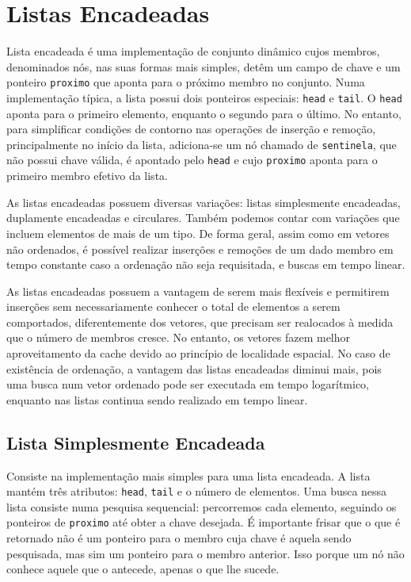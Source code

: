 \section{Listas Encadeadas}

Lista encadeada é uma implementação de conjunto dinâmico cujos membros, denominados
nós, nas suas formas mais simples, detêm um campo de chave e um ponteiro \texttt{proximo}
que aponta para o próximo membro no conjunto.
Numa implementação típica, a lista possui dois ponteiros especiais: \texttt{head} e
\texttt{tail}.
O \texttt{head} aponta para o primeiro elemento, enquanto o segundo para o último.
No entanto, para simplificar condições de contorno nas operações de inserção e remoção,
principalmente no início da lista, adiciona-se um nó chamado de \texttt{sentinela}, que
não possui chave válida, é apontado pelo \texttt{head} e cujo \texttt{proximo} aponta
para o primeiro membro efetivo da lista.

As listas encadeadas possuem diversas variações: listas simplesmente encadeadas,
duplamente encadeadas e circulares.
Também podemos contar com variações que incluem elementos de mais de um tipo.
De forma geral, assim como em vetores não ordenados, é possível realizar inserções e
remoções de um dado membro em tempo constante caso a ordenação não seja requisitada, e
buscas em tempo linear.

As listas encadeadas possuem a vantagem de serem mais flexíveis e permitirem inserções sem
necessariamente conhecer o total de elementos a serem comportados, diferentemente dos
vetores, que precisam ser realocados à medida que o número de membros cresce.
No entanto, os vetores fazem melhor aproveitamento da cache devido ao princípio de
localidade espacial.
No caso de existência de ordenação, a vantagem das listas encadeadas diminui mais,
pois uma busca num vetor ordenado pode ser executada em tempo logarítmico, enquanto
nas listas continua sendo realizado em tempo linear.

\subsection{Lista Simplesmente Encadeada}

Consiste na implementação mais simples para uma lista encadeada.
A lista mantém três atributos: \texttt{head}, \texttt{tail} e o número de elementos.
Uma busca nessa lista consiste numa pesquisa sequencial: percorremos cada elemento,
seguindo os ponteiros de \texttt{proximo} até obter a chave desejada.
É importante frisar que o que é retornado não é um ponteiro para o membro cuja chave
é aquela sendo pesquisada, mas sim um ponteiro para o membro anterior.
Isso porque um nó não conhece aquele que o antecede, apenas o que lhe sucede.

